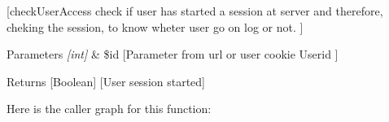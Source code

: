 \mbox{[}check\+User\+Access check if user has started a session at server and therefore, cheking the session, to know wheter user go on log or not. \mbox{]} 
\begin{DoxyParams}{Parameters}
{\em \mbox{[}int\mbox{]}} & \$id \mbox{[}Parameter from url or user cookie Userid \mbox{]} \\
\hline
\end{DoxyParams}
\begin{DoxyReturn}{Returns}
\mbox{[}Boolean\mbox{]} \mbox{[}User session started\mbox{]} 
\end{DoxyReturn}
Here is the caller graph for this function\+:
